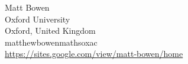\documentclass[tocmacros]{daj}
\begin{document}
\begin{dajauthors}
\begin{authorinfo}[bowen]
  Matt Bowen\\
  Oxford University\\
  Oxford, United Kingdom\\
  matthew\imagedot{}bowen\imageat{}maths\imagedot{}ox\imagedot{}ac \\
  \url{https://sites.google.com/view/matt-bowen/home}
\end{authorinfo}
\end{dajauthors}
\end{document}
